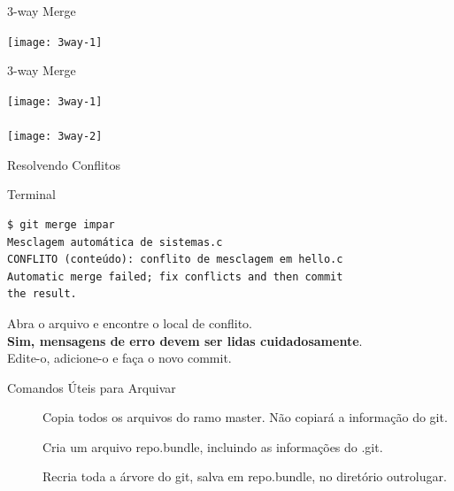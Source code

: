 \begin{frame}{3-way Merge}
	\begin{center}
		\texttt{[image: 3way-1]}
	\end{center}
\end{frame}
%
\begin{frame}{3-way Merge}
	\begin{center}
		\texttt{[image: 3way-1]}\\
		\hrulefill \\
		\texttt{[image: 3way-2]}
	\end{center}
\end{frame}

\begin{frame}[fragile]{Resolvendo Conflitos}
\begin{terminal}{Terminal}
\begin{Verbatim}[fontseries=b]
$ git merge impar
Mesclagem automática de sistemas.c
CONFLITO (conteúdo): conflito de mesclagem em hello.c
Automatic merge failed; fix conflicts and then commit
the result.
\end{Verbatim}
\end{terminal}

	Abra o arquivo e encontre o local de conflito.\\ \textbf{Sim, mensagens de erro devem ser lidas cuidadosamente}. \\
	Edite-o, adicione-o e faça o novo commit.
\end{frame}

\begin{frame}[fragile]{Comandos Úteis para Arquivar}
	\begin{description}
		\item[\color{red}]
		\item[\color{red}] Copia todos os arquivos do ramo master. Não copiará a informação do git. 				
		\item[\color{red}]  Cria um arquivo repo.bundle, incluindo as informações do .git. 
		\item[\color{red}] Recria toda a árvore do git, salva em repo.bundle, no diretório outrolugar.		
	\end{description}
\end{frame}		


